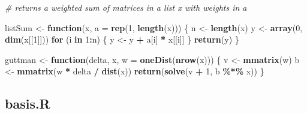 \documentclass[
  12pt,
]{article}
\newenvironment{Shaded}{\begin{snugshade}}{\end{snugshade}}
\newcommand{\AttributeTok}[1]{\textcolor[rgb]{0.13,0.29,0.53}{#1}}
\newcommand{\CommentTok}[1]{\textcolor[rgb]{0.56,0.35,0.01}{\textit{#1}}}
\newcommand{\ControlFlowTok}[1]{\textcolor[rgb]{0.13,0.29,0.53}{\textbf{#1}}}
\newcommand{\DecValTok}[1]{\textcolor[rgb]{0.00,0.00,0.81}{#1}}
\newcommand{\FunctionTok}[1]{\textcolor[rgb]{0.13,0.29,0.53}{\textbf{#1}}}
\newcommand{\NormalTok}[1]{#1}
\newcommand{\OtherTok}[1]{\textcolor[rgb]{0.56,0.35,0.01}{#1}}
\newcommand{\SpecialCharTok}[1]{\textcolor[rgb]{0.81,0.36,0.00}{\textbf{#1}}}
\begin{document}
\begin{Shaded}
\begin{Highlighting}[]
\CommentTok{\# returns a weighted sum of matrices in a list x with weights in a}

\NormalTok{listSum }\OtherTok{\textless{}{-}} \ControlFlowTok{function}\NormalTok{(x, }\AttributeTok{a =} \FunctionTok{rep}\NormalTok{(}\DecValTok{1}\NormalTok{, }\FunctionTok{length}\NormalTok{(x))) \{}
\NormalTok{  n }\OtherTok{\textless{}{-}} \FunctionTok{length}\NormalTok{(x)}
\NormalTok{  y }\OtherTok{\textless{}{-}} \FunctionTok{array}\NormalTok{(}\DecValTok{0}\NormalTok{, }\FunctionTok{dim}\NormalTok{(x[[}\DecValTok{1}\NormalTok{]]))}
  \ControlFlowTok{for}\NormalTok{ (i }\ControlFlowTok{in} \DecValTok{1}\SpecialCharTok{:}\NormalTok{n) \{}
\NormalTok{    y }\OtherTok{\textless{}{-}}\NormalTok{ y }\SpecialCharTok{+}\NormalTok{ a[i] }\SpecialCharTok{*}\NormalTok{ x[[i]]}
\NormalTok{  \}}
  \FunctionTok{return}\NormalTok{(y)}
\NormalTok{\}}

\NormalTok{guttman }\OtherTok{\textless{}{-}} \ControlFlowTok{function}\NormalTok{(delta, x, }\AttributeTok{w =} \FunctionTok{oneDist}\NormalTok{(}\FunctionTok{nrow}\NormalTok{(x))) \{}
\NormalTok{  v }\OtherTok{\textless{}{-}} \FunctionTok{mmatrix}\NormalTok{(w)}
\NormalTok{  b }\OtherTok{\textless{}{-}} \FunctionTok{mmatrix}\NormalTok{(w }\SpecialCharTok{*}\NormalTok{ delta }\SpecialCharTok{/} \FunctionTok{dist}\NormalTok{(x))}
  \FunctionTok{return}\NormalTok{(}\FunctionTok{solve}\NormalTok{(v }\SpecialCharTok{+} \DecValTok{1}\NormalTok{, b }\SpecialCharTok{\%*\%}\NormalTok{ x))}
\NormalTok{\}}
\end{Highlighting}
\end{Shaded}

\subsection{basis.R}\label{basis.r}
\end{document}
